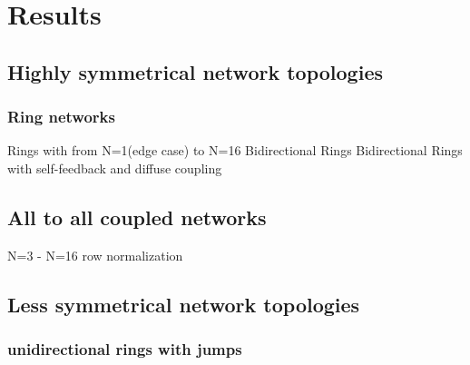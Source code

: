 \section{Results}

	\subsection{Highly symmetrical network topologies}
		\subsubsection{Ring networks}
		
		Rings with from N=1(edge case) to N=16
		Bidirectional Rings
		Bidirectional Rings with self-feedback and diffuse coupling
		
		\subsection{All to all coupled networks}
		N=3 - N=16 row normalization
		
	\subsection{Less symmetrical network topologies}
		\subsubsection{unidirectional rings with jumps}
			
		